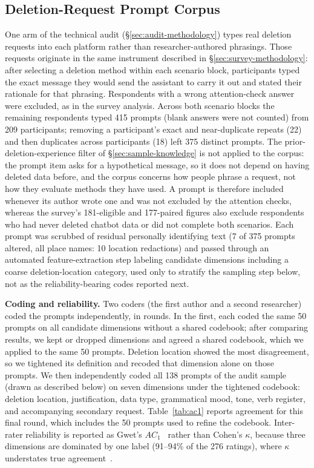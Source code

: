 \documentclass[conference,compsoc]{IEEEtran}
\begin{document}
\subsection{Deletion-Request Prompt Corpus}
\label{sec:prompt-corpus}

One arm of the technical audit (\S\ref{sec:audit-methodology}) types real
deletion requests into each platform rather than researcher-authored
phrasings. Those requests originate in the same instrument described in
\S\ref{sec:survey-methodology}: after selecting a deletion method within
each scenario block, participants typed the exact message they would send
the assistant to carry it out and stated their rationale for that
phrasing. Respondents with a wrong attention-check answer were
excluded, as in the survey analysis. Across both scenario blocks the
remaining respondents typed 415 prompts (blank answers were not counted) from
209 participants; removing a participant's exact and near-duplicate repeats
(22) and then duplicates across participants (18) left 375 distinct prompts. The prior-deletion-experience filter of
\S\ref{sec:sample-knowledge} is not applied to the corpus: the prompt item
asks for a hypothetical message, so it does not depend on having deleted data
before, and the corpus concerns how people phrase a request, not how they
evaluate methods they have used. A prompt is therefore included whenever its
author wrote one and was not excluded by the attention checks, whereas the survey's
181-eligible and 177-paired figures also exclude respondents who had never
deleted chatbot data or did not complete both scenarios. Each prompt was
scrubbed of residual personally identifying text (7 of 375 prompts
altered, all place names: 10 location redactions) and passed through an
automated feature-extraction step labeling candidate dimensions including
a coarse deletion-location category, used only to stratify the sampling
step below, not as the reliability-bearing codes reported next.

\textbf{Coding and reliability.} Two coders (the first author and a second
researcher) coded the prompts independently, in rounds. In the first, each
coded the same 50 prompts on all candidate dimensions without a shared
codebook; after comparing results, we kept or dropped dimensions and agreed a
shared codebook, which we applied to the same 50 prompts. Deletion location
showed the most disagreement, so we tightened its definition and recoded that
dimension alone on those prompts. We then independently coded all 138 prompts
of the audit sample (drawn as described below) on seven dimensions under the
tightened codebook: deletion location, justification, data type, grammatical
mood, tone, verb register, and accompanying secondary request.
Table~\ref{tab:ac1} reports agreement for this final round, which includes the
50 prompts used to refine the codebook.
Inter-rater reliability is reported as Gwet's $AC_1$~\cite{gwet2008ac1}
rather than Cohen's $\kappa$, because three dimensions are dominated by
one label (91--94\% of the 276 ratings), where $\kappa$ understates true
agreement~\cite{gwet2008ac1,wongpakaran2013comparison}.
\end{document}
